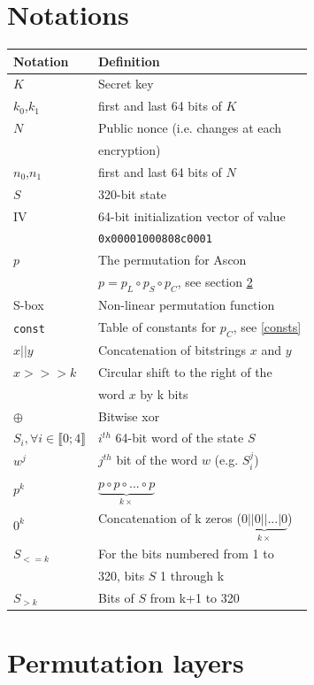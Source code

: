 \documentclass[a4paper,11pt,twocolumn]{article}
\begin{document}
	\section{Notations} \label{notations}
	\begin{tabular}{ll}
		\hline
		\textbf{Notation}&\textbf{Definition}\\
		\hline
		$K$&Secret key\\
		$k_0$,$k_1$&first and last 64 bits of $K$\\
		$N$&Public nonce (i.e. changes at each\\
		&encryption)\\
		$n_0$,$n_1$&first and last 64 bits of $N$\\
		$S$&320-bit state\\
		IV&64-bit initialization vector of value\\
		&\verb|0x00001000808c0001|\\
		$p$&The permutation for Ascon \\
		&$p=p_L \circ p_S \circ p_C$, see section \ref{perm}\\
		S-box&Non-linear permutation function\\
		\verb|const|&Table of constants for $p_C$, see \ref{consts}\\
		\hline
		$x||y$&Concatenation of bitstrings $x$ and $y$\\
		$x>>>k$&Circular shift to the right of the\\
		&word $x$ by k bits\\
		$\oplus$&Bitwise xor\\
		\hline
		$S_i, \forall i \in \llbracket 0;4 \rrbracket$&$i^{th}$ 64-bit word of the state $S$\\
		$w^j$&$j^{th}$ bit of the word $w$ (e.g. $S_i^j$) \\
		$p^k$&$\underbrace{p \circ p \circ ... \circ p}_{k \times}$\\
		$0^k$&Concatenation of k zeros ($\underbrace{0||0|| ... |0}_{k \times}$)\\
		$S_{<=k}$&For the bits numbered from 1 to\\
		&320, bits $S$ 1 through k\\
		$S_{>k}$&Bits of $S$ from k+1 to 320\\
		\hline
	\end{tabular}
	
	
	\section{Permutation layers} \label{perm}
	
\end{document}

